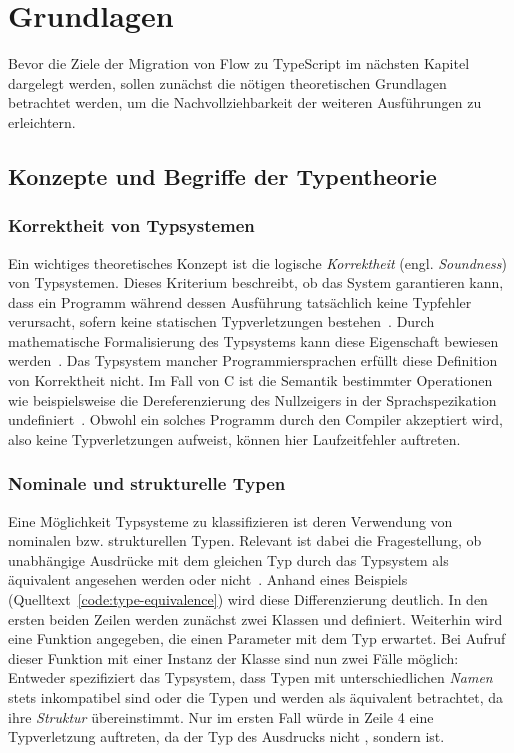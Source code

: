\chapter{Grundlagen}
\label{chap:basics}

Bevor die Ziele der Migration von Flow zu TypeScript im nächsten Kapitel dargelegt werden, sollen zunächst die nötigen theoretischen Grundlagen betrachtet werden, um die Nachvollziehbarkeit der weiteren Ausführungen zu erleichtern.

\section{Konzepte und Begriffe der Typentheorie}

\subsection{Korrektheit von Typsystemen}
Ein wichtiges theoretisches Konzept ist die logische \emph{Korrektheit} (engl. \emph{Soundness}) von Typsystemen. Dieses Kriterium beschreibt, ob das System garantieren kann, dass ein Programm während dessen Ausführung tatsächlich keine Typfehler verursacht, sofern keine statischen Typverletzungen bestehen~\autocite{WRIGHT:1994}. Durch mathematische Formalisierung des Typsystems kann diese Eigenschaft bewiesen werden~\autocite[7]{CARDELLI:TYPE_SYSTEMS}.
Das Typsystem mancher Programmiersprachen erfüllt diese Definition von Korrektheit nicht. Im Fall von C ist die Semantik bestimmter Operationen wie beispielsweise die Dereferenzierung des Nullzeigers in der Sprachspezikation undefiniert~\autocite[79]{ISO:C99}. Obwohl ein solches Programm durch den Compiler akzeptiert wird, also keine Typverletzungen aufweist, können hier Laufzeitfehler auftreten.

\subsection{Nominale und strukturelle Typen}
Eine Möglichkeit Typsysteme zu klassifizieren ist deren Verwendung von nominalen bzw. strukturellen Typen. Relevant ist dabei die Fragestellung, ob unabhängige Ausdrücke mit dem gleichen Typ durch das Typsystem als äquivalent angesehen werden oder nicht~\autocite[9]{CARDELLI:TYPE_SYSTEMS}. Anhand eines Beispiels (Quelltext~\ref{code:type-equivalence}) wird diese Differenzierung deutlich. In den ersten beiden Zeilen werden zunächst zwei Klassen  und  definiert. Weiterhin wird eine Funktion  angegeben, die einen Parameter mit dem Typ  erwartet. Bei Aufruf dieser Funktion mit einer Instanz der Klasse  sind nun zwei Fälle möglich: Entweder spezifiziert das Typsystem, dass Typen mit unterschiedlichen \emph{Namen} stets inkompatibel sind oder die Typen  und  werden als äquivalent betrachtet, da ihre \emph{Struktur} übereinstimmt. Nur im ersten Fall würde in Zeile 4 eine Typverletzung auftreten, da der Typ des Ausdrucks  nicht , sondern  ist.

